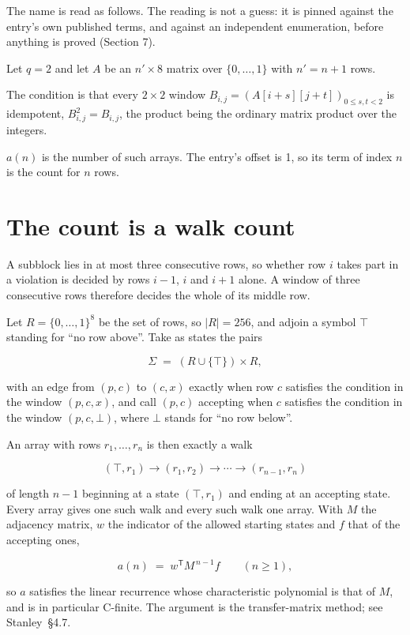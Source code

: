 \documentclass[11pt]{article}
\theoremstyle{definition}
\begin{document}
The name is read as follows. The reading is not a guess: it is pinned against the entry's own published terms, and against an independent enumeration, before anything is proved (Section 7).

Let $q = 2$ and let $A$ be an $n' \times 8$ matrix over $\{0,\dots,1\}$ with $n' = n + 1$ rows.

The condition is that every $2 \times 2$ window $B_{i,j} = (A[i{+}s][j{+}t])_{0 \le s,t < 2}$ is idempotent, $B_{i,j}^2 = B_{i,j}$, the product being the ordinary matrix product over the integers.

$a(n)$ is the number of such arrays. The entry's offset is 1, so its term of index $n$ is the count for $n$ rows.

\section{The count is a walk count}

A subblock lies in at most three consecutive rows, so whether row $i$ takes part in a violation is decided by rows $i-1$, $i$ and $i+1$ alone. A window of three consecutive rows therefore decides the whole of its middle row.

Let $R = \{0,\dots,1\}^{8}$ be the set of rows, so $|R| = 256$, and adjoin a symbol $\top$ standing for ``no row above''. Take as states the pairs

\[\Sigma \;=\; (R \cup \{\top\}) \times R,\]

with an edge from $(p,c)$ to $(c,x)$ exactly when row $c$ satisfies the condition in the window $(p,c,x)$, and call $(p,c)$ accepting when $c$ satisfies the condition in the window $(p,c,\bot)$, where $\bot$ stands for ``no row below''.

An array with rows $r_1,\dots,r_n$ is then exactly a walk

\[(\top,r_1) \to (r_1,r_2) \to \cdots \to (r_{n-1},r_n)\]

of length $n-1$ beginning at a state $(\top,r_1)$ and ending at an accepting state. Every array gives one such walk and every such walk one array. With $M$ the adjacency matrix, $w$ the indicator of the allowed starting states and $f$ that of the accepting ones,

\[a(n) \;=\; w^{\mathsf T} M^{\,n-1} f \qquad (n \ge 1),\]

so $a$ satisfies the linear recurrence whose characteristic polynomial is that of $M$, and is in particular C-finite. The argument is the transfer-matrix method; see Stanley~\S4.7.
\end{document}
